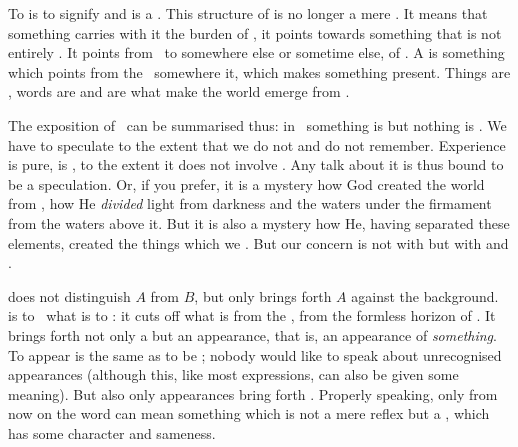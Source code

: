 To  is to {signify} and  is a . This
structure of  is no longer a mere . It means that
something  carries with it the burden of , it
points towards something that is not entirely .
It points from \herenow\ to somewhere else or sometime else,  of
\herenow.  A  is something which points from the \hoa\ somewhere
 it, which makes something  present.
  Things are , words are  and
 are what make the world emerge from .

\pa\label{pa:speculation} The exposition of \pexp\ can be summarised thus: in
\pexp\ something is  but nothing is .
We have to speculate to the extent that we do not  and do not
remember. {Experience is {pure}, is , to the extent it does not
  involve .} Any talk about it is thus bound to be a
speculation.  Or, if you prefer, it is a mystery how God created the world from
, how He {\em divided} light from darkness and the waters under
the firmament from the waters above it. But it is also a mystery how He, having
separated these  elements, created the things which we
. But our concern is not with  but with  and
.

 does not distinguish $A$ from $B$, but only brings forth
$A$ against the  background.  is to \pexp\ what
 is to : it {cuts} off what is
 from the , from the formless horizon of \pexp. It
brings forth not only a  but an appearance, that is, an
appearance of {\em something}. 
To appear is the same as to be ; nobody would like to speak about
unrecognised appearances (although this, like most expressions, can also be
given some meaning). But also only appearances bring forth .
Properly speaking, only from now on the word  can mean something
which is not a mere reflex but a , which has some character and
sameness.


